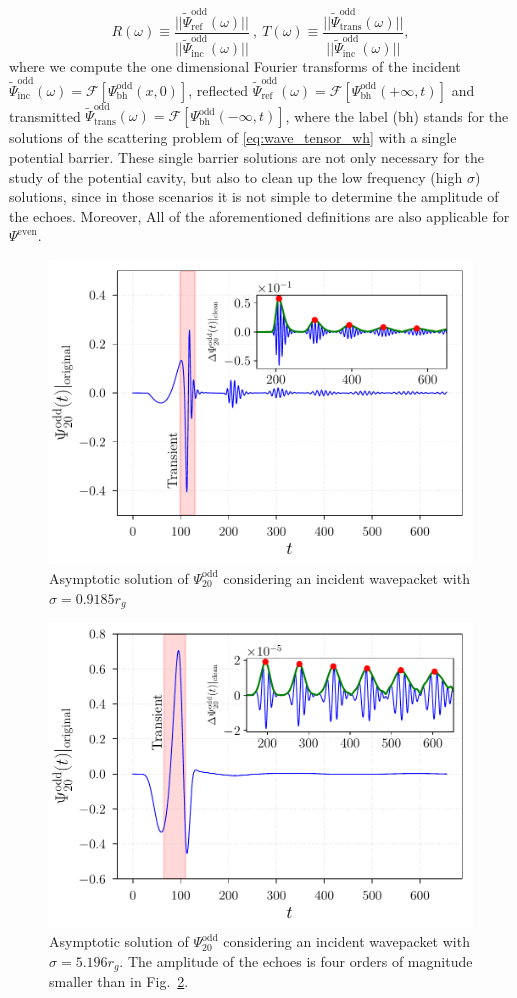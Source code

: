 \documentclass[article,aps,nofootinbib,twocolumn,superscriptaddress]{revtex4-1}
\begin{document}
\begin{equation}
R(\omega)\equiv \frac{||\tilde{\Psi}_{\mathrm{ref}}^{\mathrm{odd}}(\omega)||}{||\tilde{\Psi}_{\mathrm{inc}}^{\mathrm{odd}}(\omega)||}~,~T(\omega)\equiv  \frac{||\tilde{\Psi}_{\mathrm{trans}}^{\mathrm{odd}}(\omega)||}{||\tilde{\Psi}_{\mathrm{inc}}^{\mathrm{odd}}(\omega)||},
\label{eq:odd_ref_and_trans}
\end{equation}
where we compute the one dimensional Fourier transforms of the incident $\tilde{\Psi}_{\mathrm{inc}}^{\mathrm{odd}}(\omega)=\mathcal{F}[\Psi^{\mathrm{odd}}_{\mathrm{bh}}(x,0)]$, reflected $\tilde{\Psi}_{\mathrm{ref}}^{\mathrm{odd}}(\omega)=\mathcal{F}[\Psi^{\mathrm{odd}}_{\mathrm{bh}}(+\infty,t)]$ and transmitted $\tilde{\Psi}_{\mathrm{trans}}^{\mathrm{odd}}(\omega)=\mathcal{F}[\Psi^{\mathrm{odd}}_{\mathrm{bh}}(-\infty,t)]$, where the label (bh) stands for the solutions of the scattering problem of \eqref{eq:wave_tensor_wh} with a single potential barrier. These single barrier solutions are not only necessary for the study of the potential cavity, but also to clean up the low frequency (high $\sigma$) solutions, since in those scenarios it is not simple to determine the amplitude of the echoes. Moreover, All of the aforementioned definitions are also applicable for $\Psi^{\mathrm{even}}$. 

\begin{figure}[t!]
\centering
\includegraphics[width=.45\textwidth]{figures/Odd_echo_w_09185.pdf}
\caption{\label{fig:odd_sigma_small} Asymptotic solution of $\Psi^{\mathrm{odd}}_{20}$ considering an incident wavepacket with $\sigma=0.9185r_g$}
\end{figure}

\begin{figure}[t!]
\centering
\includegraphics[width=.45\textwidth]{figures/Odd_echo.pdf}
\caption{\label{fig:odd_sigma_large} Asymptotic solution of $\Psi^{\mathrm{odd}}_{20}$ considering an incident wavepacket with $\sigma=5.196r_g$. The amplitude of the echoes is four orders of magnitude smaller than in Fig.~\ref{fig:odd_sigma_large}.}
\end{figure}
\end{document}
